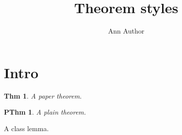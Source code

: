 \documentclass[AMA,Times1COL]{WileyNJDv5}
\newtheorem{thm}{Thm}
\theoremstyle{plain}
\newtheorem{pthm}{PThm}
\begin{document}
\title{Theorem styles}
\author{Ann Author}
\maketitle
\section{Intro}
\begin{thm}A paper theorem.\end{thm}
\begin{pthm}A plain theorem.\end{pthm}
\begin{lemma}A class lemma.\end{lemma}
\end{document}
